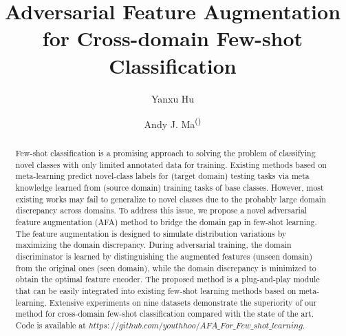 \documentclass[runningheads]{utils/llncs}
\begin{document}
\pagestyle{headings}
\mainmatter
\def\ECCVSubNumber{100}  

\title{Adversarial Feature Augmentation for Cross-domain Few-shot Classification} 

\begin{comment}
\titlerunning{ECCV-22 submission ID \ECCVSubNumber} 
\authorrunning{ECCV-22 submission ID \ECCVSubNumber} 
\author{Anonymous ECCV submission}
\institute{Paper ID \ECCVSubNumber}
\end{comment}


\author{Yanxu Hu \and
Andy J. Ma\textsuperscript{(\Letter)}
}


\maketitle

\begin{abstract}
Few-shot classification is a promising approach to solving the problem of classifying novel classes with only limited annotated data for training. 
Existing methods based on meta-learning predict novel-class labels for (target domain) testing tasks via meta knowledge learned from (source domain) training tasks of base classes.
However, most existing works may fail to generalize to novel classes due to the probably large domain discrepancy across domains.
To address this issue, we propose a novel adversarial feature augmentation (AFA) method to bridge the domain gap in few-shot learning.
The feature augmentation is designed to simulate distribution variations by maximizing the domain discrepancy.
During adversarial training, the domain discriminator is learned by distinguishing the augmented features (unseen domain) from the original ones (seen domain), while the domain discrepancy is minimized to obtain the optimal feature encoder.
The proposed method is a plug-and-play module that can be easily integrated into existing few-shot learning methods based on meta-learning.
Extensive experiments on nine datasets demonstrate the superiority of our method for cross-domain few-shot classification compared with the state of the art.
Code is available at \href{https://github.com/youthhoo/AFA_For_Few_shot_learning}{$https://github.com/youthhoo/AFA\_For\_Few\_shot\_learning$}.
\end{abstract} 
\end{document}
